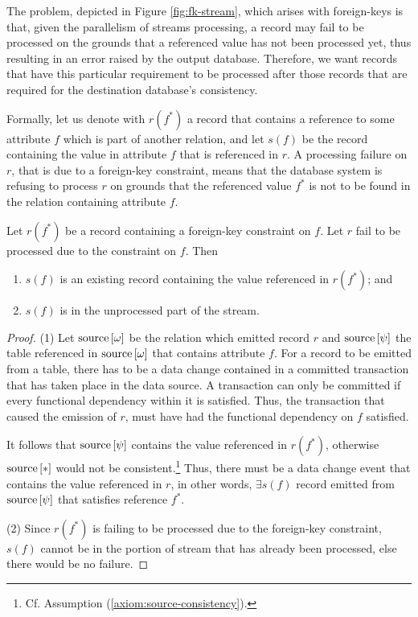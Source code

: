 The problem, depicted in Figure \ref{fig:fk-stream}, which arises with foreign-keys is that, given the parallelism of streams processing, a record may fail to be processed on the grounds that a referenced value has not been processed yet, thus resulting in an error raised by the output database.
Therefore, we want records that have this particular requirement to be processed after those records that are required for the destination database's consistency.

Formally, let us denote with $r(f^*)$ a record that contains a reference to some attribute $f$ which is part of another relation, and let $s(f)$ be the record containing the value in attribute $f$ that is referenced in $r$.
A processing failure on $r$, that is due to a foreign-key constraint, means that the database system is refusing to process $r$ on grounds that the referenced value $f^*$ is not to be found in the relation containing attribute $f$.

\begin{proposition}\label{prop:fk}
	Let $r(f^*)$ be a record containing a foreign-key constraint on $f$.
	Let $r$ fail to be processed due to the constraint on $f$.
	Then
	\begin{enumerate}
		\item $s(f)$ is an existing record containing the value referenced in $r(f^*)$; and
		\item $s(f)$ is in the unprocessed part of the stream.
	\end{enumerate}
\end{proposition}
\begin{proof}
	(1) Let $\text{source}\left[{\omega}\right]$ be the relation which emitted record $r$ and $\text{source}\left[{\psi}\right]$ the table referenced in $\text{source}\left[{\omega}\right]$ that contains attribute $f$.
	For a record to be emitted from a table, there has to be a data change contained in a committed transaction that has taken place in the data source.
	A transaction can only be committed if every functional dependency within it is satisfied.
	Thus, the transaction that caused the emission of $r$, must have had the functional dependency on $f$ satisfied.
	
	It follows that $\text{source}\left[{\psi}\right]$ contains the value referenced in $r(f^*)$, otherwise $\text{source}\left[{*}\right]$ would not be consistent.\footnote{Cf. Assumption (\ref{axiom:source-consistency}).}
	Thus, there must be a data change event that contains the value referenced in $r$, in other words, $\exists s(f)$ record emitted from $\text{source}\left[{\psi}\right]$ that satisfies reference $f^*$.
	
	(2) Since $r(f^*)$ is failing to be processed due to the foreign-key constraint, $s(f)$ cannot be in the portion of stream that has already been processed, else there would be no failure.
\end{proof}

